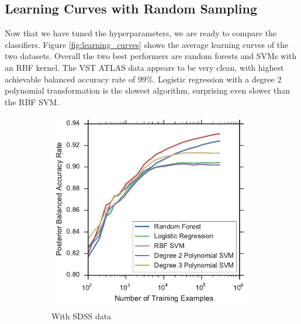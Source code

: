 \subsection{Learning Curves with Random Sampling}
\label{sec:lc}

Now that we have tuned the hyperparameters, we are ready to compare the classifiers.
Figure \ref{fig:learning_curves} shows the average learning curves of the two datasets.
Overall the two best performers are random forests and SVMs with an RBF kernel. The VST ATLAS
data appears to be very clean, with highest achievable balanced accuracy rate of 99\%.
Logistic regression with a degree 2 polynomial transformation is the slowest algorithm,
surprising even slower than the RBF SVM.

\begin{figure}[tbp]
	\centering
	\begin{subfigure}{.5\textwidth}
		\centering
		\includegraphics[width=0.99\textwidth]{figures/4_expt1/sdss_learning_curves}
		\caption{With SDSS data}
		\label{fig:sdss_learning_curves}
	\end{subfigure}%
	\begin{subfigure}{.5\textwidth}
		\centering

\end{subfigure}
\end{figure}
